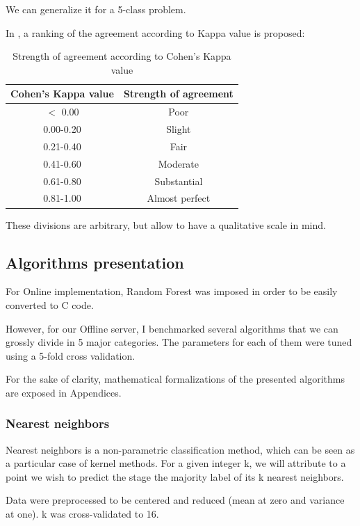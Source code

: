 \documentclass[12pt]{report}
\begin{document}
We can generalize it for a 5-class problem.

In \cite{landis1977measurement}, a ranking of the agreement according to Kappa value is proposed:

\begin{table}[H]
\centering
\begin{tabular}{c|c}
Cohen's Kappa value & Strength of agreement \\\hline
$<$ 0.00 & Poor \\
0.00-0.20 & Slight \\
0.21-0.40 & Fair \\
0.41-0.60 & Moderate \\
0.61-0.80 & Substantial \\
0.81-1.00 & Almost perfect \\
\end{tabular}
\caption{\label{tab:kappa_strength}Strength of agreement according to Cohen's Kappa value}
\end{table}

These divisions are arbitrary, but allow to have a qualitative scale in mind.

\subsection{Algorithms presentation}

For Online implementation, Random Forest was imposed in order to be easily converted to C code.

However, for our Offline server, I benchmarked several algorithms that we can grossly divide in 5 major categories. The parameters for each of them were tuned using a 5-fold cross validation.

For the sake of clarity, mathematical formalizations of the presented algorithms are exposed in Appendices. 

\subsubsection{Nearest neighbors}

Nearest neighbors is a non-parametric classification method, which can be seen as a particular case of kernel methods. For a given integer k, we will attribute to a point we wish to predict the stage the majority label of its k nearest neighbors.

Data were preprocessed to be centered and reduced (mean at zero and variance at one). k was cross-validated to 16.
\end{document}
